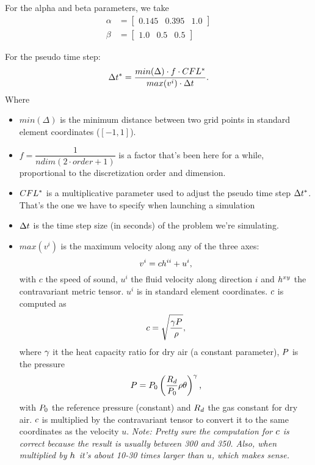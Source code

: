 \documentclass{article}
\begin{document}
For the alpha and beta parameters, we take
\begin{align}
    \alpha &= \left[\begin{matrix} 0.145 & 0.395 & 1.0 \end{matrix}\right] \\
    \beta  &= \left[\begin{matrix} 1.0 & 0.5 & 0.5 \end{matrix}\right]
\end{align}

For the pseudo time step:
\begin{equation}
    \Delta t^* = \dfrac{min(\Delta) \cdot f \cdot CFL^*}{max(v^i) \cdot \Delta t}
    \text{.}
\end{equation}
Where
\begin{itemize}
\item $min(\Delta)$ is the minimum distance between two grid points in 
    standard element coordinates ($[-1, 1]$).
\item $f = \dfrac{1}{ndim \left(2\cdot order + 1\right)}$ is a factor that's been here for a while,
    proportional to the discretization order and dimension.
\item $CFL^*$ is a multiplicative parameter used to adjust the pseudo time step $\Delta t^*$.
    That's the one we have to specify when launching a simulation
\item $\Delta t$ is the time step size (in seconds) of the problem we're simulating.
\item $max(v^i)$ is the maximum velocity along any of the three axes:
    \begin{equation}
        v^i = c h^{{i}{i}} + u^i
        \text{,}
    \end{equation}
    with $c$ the speed of sound, $u^i$ the fluid velocity along direction $i$ and $h^{{x}{y}}$
    the contravariant metric tensor. $u^i$ is in standard element coordinates.
    $c$ is computed as
    \begin{equation}
        c = \sqrt{\dfrac{\gamma P}{\rho}}
        \text{,}
    \end{equation}
    where $\gamma$ it the heat capacity ratio for dry air (a constant parameter),
    $P$ is the pressure
    \begin{equation}
        P = P_0 \left(\dfrac{R_d}{P_0}\rho\theta\right)^\gamma
        \text{,}
    \end{equation}
    with $P_0$ the reference pressure (constant) and $R_d$ the gas constant for dry air.
    $c$ is multiplied by the contravariant tensor to convert it to the same coordinates
    as the velocity $u$.
    \emph{Note: Pretty sure the computation for $c$ is correct because the result is usually
    between 300 and 350.
    Also, when multiplied by $h^{{}{}}$ it's about 10-30 times larger than $u$, which makes sense.}
\end{itemize}
\end{document}
